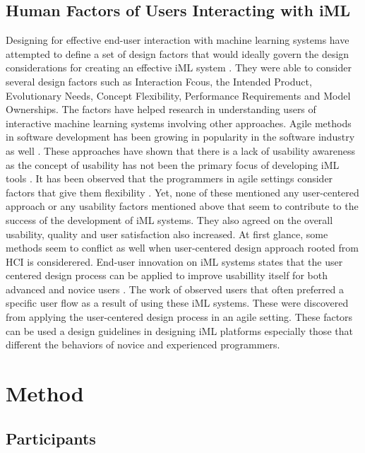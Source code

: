 \documentclass{sigchi}
\begin{document}
\subsection{Human Factors of Users Interacting with iML}
Designing for effective end-user interaction with machine learning systems have attempted to define a set of design factors that would ideally govern the design considerations for creating an effective iML system \cite{amershi2011designing}. They were able to consider several design factors such as Interaction Fcous, the Intended Product, Evolutionary Needs, Concept Flexibility, Performance Requirements and Model Ownerships. The factors have helped research in understanding users of interactive machine learning systems involving other approaches. Agile methods in software development has been growing in popularity in the software industry as well \cite{hussain2009current}. These approaches have shown that there is a lack of usability awareness as the concept of usability has not been the primary focus of developing iML tools \cite{da2011user}. It has been observed that the programmers in agile settings consider factors that give them flexibility \cite{hussain2009current}. Yet, none of these mentioned any user-centered approach or any usability factors mentioned above that seem to contribute to the success of the development of iML systems. They also agreed on the overall usability, quality and user satisfaction also increased. At first glance, some methods seem to conflict as well when user-centered design approach rooted from HCI is considerered. End-user innovation on iML systems states that the user centered design process can be applied to improve usabillity itself for both advanced and novice users \cite{bernardo2016interactive}. The work of \cite{sarkar2015interactive} observed users that often preferred a specific user flow as a result of using these iML systems. These were discovered from applying the user-centered design process in an agile setting. These factors can be used a design guidelines in designing iML platforms especially those that different the behaviors of novice and experienced programmers. 
\section{Method}

\subsection{Participants}
\end{document}
